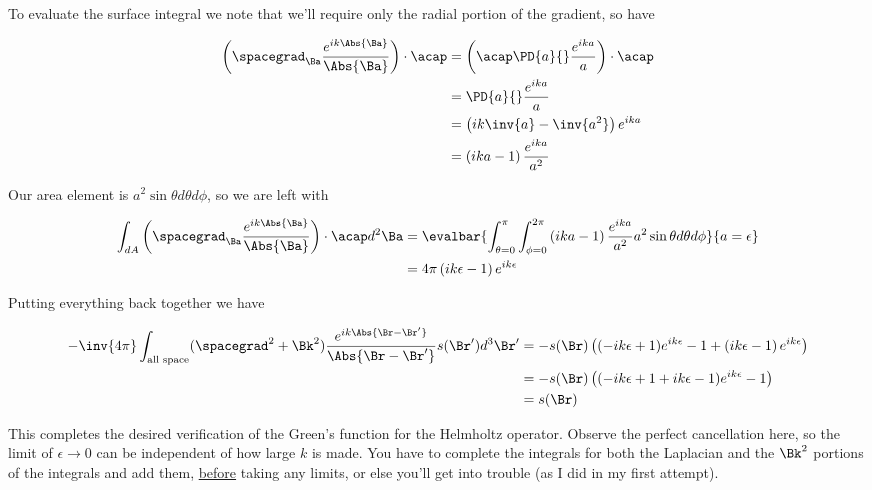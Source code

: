 To evaluate the surface integral we note that we'll require only the radial portion of the gradient, so have

\begin{align*}
\left( \spacegrad_\Ba \frac{e^{i k \Abs{\Ba}}}{\Abs{\Ba}} \right) \cdot \acap
&=
\left( \acap \PD{a}{} \frac{e^{i k a}}{a} \right) \cdot \acap \\
&=
\PD{a}{} \frac{e^{i k a}}{a} \\
&=
\left( i k \inv{a} - \inv{a^2} \right)
e^{i k a} \\
&=
\left( i k a - 1 \right)
\frac{e^{i k a}}{a^2}
\end{align*}

Our area element is $a^2 \sin\theta d\theta d\phi$, so we are left with

\begin{align*}
\int_{dA} \left( \spacegrad_\Ba \frac{e^{i k \Abs{\Ba}}}{\Abs{\Ba}} \right) \cdot \acap d^2 \Ba 
&=
\evalbar{
\int_{\theta = 0}^\pi \int_{\phi=0}^{2\pi}
\left( i k a - 1 \right)
\frac{e^{i k a}}{a^2}
a^2 \sin\theta d\theta d\phi 
}{a = \epsilon}
\\
&=
4 \pi
\left( i k \epsilon - 1 \right) e^{i k \epsilon}
\end{align*}

Putting everything back together we have

\begin{align*}
-\inv{4\pi} \int_{\text{all space}} (\spacegrad^2 + \Bk^2) \frac{e^{i k \Abs{\Br - \Br'}}}{\Abs{\Br - \Br'}} s(\Br') d^3 \Br'
&=
-s(\Br)
\left(
(-i k \epsilon + 1)e^{i k \epsilon} - 1 
+\left( i k \epsilon - 1 \right) e^{i k \epsilon}
\right) \\
&=
-s(\Br)
\left(
(-i k \epsilon + 1 + i k \epsilon - 1 )e^{i k \epsilon} - 1 
\right) \\
&=
s(\Br)
\end{align*}

This completes the desired verification of the Green's function for the Helmholtz operator.  Observe the perfect cancellation here, so the limit of $\epsilon \rightarrow 0$ can be independent of how large $k$ is made.  You have to complete the integrals for both the Laplacian and the $\Bk^2$ portions of the integrals and add them, \underline{before} taking any limits, or else you'll get into trouble (as I did in my first attempt).

\EndArticle
